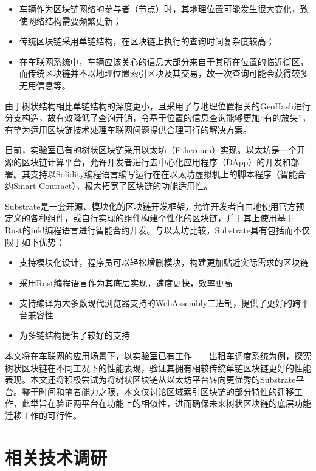 \begin{itemize}
  \item 车辆作为区块链网络的参与者（节点）时，其地理位置可能发生很大变化，致使网络结构需要频繁更新；
  \item 传统区块链采用单链结构，在区块链上执行的查询时间复杂度较高；
  \item 在车联网系统中，车辆应该关心的信息大部分来自于其所在位置的临近街区，而传统区块链并不以地理位置索引区块及其交易，故一次查询可能会获得较多无用信息等。
\end{itemize}

由于树状结构相比单链结构的深度更小，且采用了与地理位置相关的GeoHash进行分支构造，故有效降低了查询开销，令基于位置的信息查询能够更加“有的放矢”，有望为运用区块链技术处理车联网问题提供合理可行的解决方案。

目前，实验室已有的树状区块链采用以太坊（Ethereum）实现。以太坊是一个开源的区块链计算平台，允许开发者进行去中心化应用程序（DApp）的开发和部署。其支持以Solidity编程语言编写运行在在以太坊虚拟机上的脚本程序（智能合约Smart Contract），极大拓宽了区块链的功能适用性。

Substrate是一套开源、模块化的区块链开发框架，允许开发者自由地使用官方预定义的各种组件，或自行实现的组件构建个性化的区块链，并于其上使用基于Rust的ink!编程语言进行智能合约开发。与以太坊比较，Substrate具有包括而不仅限于如下优势：

\begin{itemize}
  \item 支持模块化设计，程序员可以轻松增删模块，构建更加贴近实际需求的区块链
  \item 采用Rust编程语言作为其底层实现，速度更快，效率更高
  \item 支持编译为大多数现代浏览器支持的WebAssembly二进制，提供了更好的跨平台兼容性
  \item 为多链结构提供了较好的支持
\end{itemize}

本文将在车联网的应用场景下，以实验室已有工作——出租车调度系统为例，探究树状区块链在不同工况下的性能表现，验证其拥有相较传统单链区块链更好的性能表现。本文还将积极尝试为将树状区块链从以太坊平台转向更优秀的Substrate平台。鉴于时间和笔者能力之限，本文仅讨论区域索引区块链的部分特性的迁移工作，此举旨在验证两平台在功能上的相似性，进而确保未来树状区块链的底层功能迁移工作的可行性。

\section{相关技术调研}

